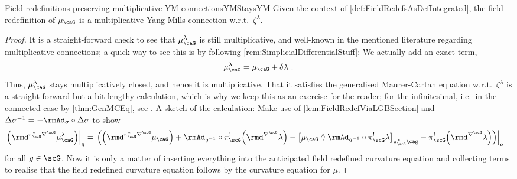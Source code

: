 \documentclass[reqno,a4paper,oneside]{amsart}
\newcommand\mutot{\mu_\caG}
\theoremstyle{plain}
\theoremstyle{remark}
\theoremstyle{definition}
\begin{document}
\begin{propositions}{Field redefinitions preserving multiplicative YM connections}{YMStaysYM}
Given the context of \ref{def:FieldRedefsAsDefIntegrated}, the field redefinition of $\mutot$ is a multiplicative Yang-Mills connection w.r.t.\ $\zeta^\lambda$.
\end{propositions}

\begin{proof}
\leavevmode\newline
It is a straight-forward check to see that $\mutot^{\lambda}$ is still multiplicative, and well-known in the mentioned literature regarding multiplicative connections; a quick way to see this is by following \ref{rem:SimplicialDifferentialStuff}: We actually add an exact term,
\begin{equation*}
\mutot^{\lambda}
=
\mutot
	+ \delta \lambda ~.
\end{equation*}
Thus, $\mutot^{\lambda}$ stays multiplicatively closed, and hence it is multiplicative. That it satisfies the generalised Maurer-Cartan equation w.r.t.\ $\zeta^\lambda$ is a straight-forward but a bit lengthy calculation, which is why we keep this as an exercise for the reader; for the infinitesimal, i.e.\ in the connected case by \ref{thm:GenMCEq}, see \cite{My1stpaper, MyThesis}. {\color{Cred2} A sketch of the calculation: Make use of \ref{lem:FieldRedefViaLGBSection} and $\Delta \sigma^{-1} = -\rmAd_\sigma \circ \Delta \sigma$ to show
    \begin{align*}
        \mleft.\mleft(\rmd^{\pi_\scG^*\nabla^\scG} \mutot^\lambda\mright)\mright|_g
        &=
        \mleft.\mleft(\mleft(\rmd^{\pi_\scG^*\nabla^\scG} \mutot\mright)
            + \rmAd_{g^{-1}} \circ \pi_\scG^!\mleft(\rmd^{\nabla^\scG}\lambda\mright)
            - \mleft[ \mutot \stackrel{\wedge}{,} \rmAd_{g^{-1}} \circ \pi_\scG^! \lambda \mright]_{\pi_\scG^*\cag}
            - \pi_\scG^!\mleft(\rmd^{\nabla^\scG}\lambda\mright)\mright)\mright|_g
    \end{align*}
    for all $g \in \scG$. Now it is only a matter of inserting everything into the anticipated field redefined curvature equation and collecting terms to realise that the field redefined curvature equation follows by the curvature equation for $\mu$.}
\end{proof}
\end{document}
